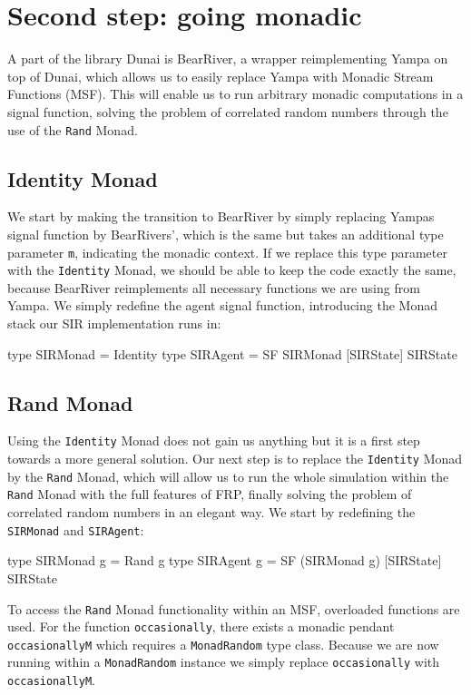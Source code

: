 \section{Second step: going monadic}
\label{sec:timedriven_monadic}
A part of the library Dunai is BearRiver, a wrapper reimplementing Yampa on top of Dunai, which allows us to easily replace Yampa with Monadic Stream Functions (MSF). This will enable us to run arbitrary monadic computations in a signal function, solving the problem of correlated random numbers through the use of the \texttt{Rand} Monad.

\subsection{Identity Monad}
We start by making the transition to BearRiver by simply replacing Yampas signal function by BearRivers', which is the same but takes an additional type parameter \texttt{m}, indicating the monadic context. If we replace this type parameter with the \texttt{Identity} Monad, we should be able to keep the code exactly the same, because BearRiver reimplements all necessary functions we are using from Yampa. We simply redefine the agent signal function, introducing the Monad stack our SIR implementation runs in:

\begin{HaskellCode}
type SIRMonad = Identity
type SIRAgent = SF SIRMonad [SIRState] SIRState
\end{HaskellCode}

\subsection{Rand Monad}
Using the \texttt{Identity} Monad does not gain us anything but it is a first step towards a more general solution. Our next step is to replace the \texttt{Identity} Monad by the \texttt{Rand} Monad, which will allow us to run the whole simulation within the \texttt{Rand} Monad with the full features of FRP, finally solving the problem of correlated random numbers in an elegant way. We start by redefining the \texttt{SIRMonad} and \texttt{SIRAgent}:

\begin{HaskellCode}
type SIRMonad g = Rand g
type SIRAgent g = SF (SIRMonad g) [SIRState] SIRState
\end{HaskellCode}

To access the \texttt{Rand} Monad functionality within an MSF, overloaded functions are used. For the function \texttt{occasionally}, there exists a monadic pendant \texttt{occasionallyM} which requires a \texttt{MonadRandom} type class. Because we are now running within a \texttt{MonadRandom} instance we simply replace \texttt{occasionally} with \texttt{occasionallyM}. 

